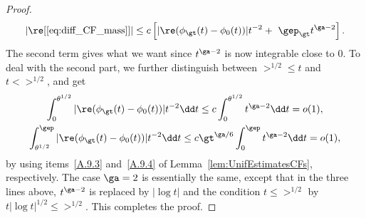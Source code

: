 \begin{proof}
\begin{equation}
\mathopen{|}\re[\eqref{eq:diff_CF_mass}]| \le c
\left[
\mathopen{|} \re(\phi_\gt(t) - \phi_0(t))| t^{-2} +\
\gep_\gt t^{\ga - 2}\right].
\end{equation} The second term gives what we want since $t^{\ga-2}$ is now integrable close to $0$. To deal with the second part, we further distinguish between $\gt^{1/2} \le t$ and $t < \gt^{1/2}$, and get
\begin{gather}
\int_0^{\theta^{1/2}} |{\re(\phi_\gt(t) - \phi_0(t))}| t^{-2} \dd t \le c \int_0^{\theta^{1/2}} t^{\ga-2} \dd t= o(1),
\\
\int_{\theta^{1/2}}^\gep |{\re(\phi_\gt(t) - \phi_0(t))}| t^{-2} \dd t \le c \gt^{\ga/6} \int_0^{\gep} t^{\ga-2} \dd t = o(1),
\end{gather}
by using items~\eqref{A.9.3} and~\eqref{A.9.4} of Lemma~\ref{lem:UnifEstimatesCFs}, respectively. The case $\ga = 2$ is essentially the same, except that in the three lines above, $t^{\ga-2}$ is replaced by $|\log t|$ and the condition $t\le \gt^{1/2}$ by $t|\log t|^{1/2}\le \gt^{1/2}$. This completes the proof.
\end{proof}

